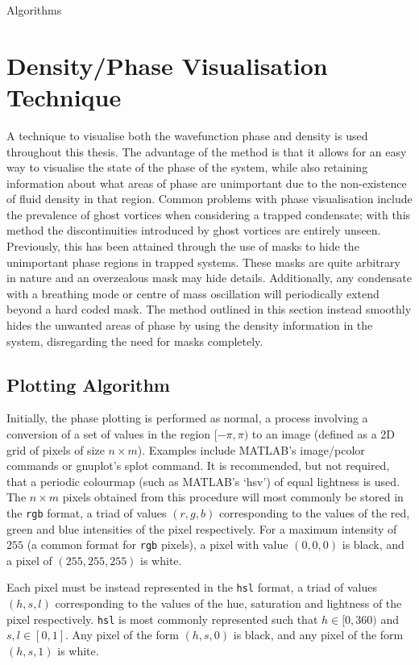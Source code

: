 \begin{chapter}{\label{app:algorithms}Algorithms}
\section{\label{appsection:vizalgos} Density/Phase Visualisation Technique}
A technique to visualise both the wavefunction phase and density is used throughout this thesis. The advantage of the method is that it allows for an easy way to visualise the state of the phase of the system, while also retaining information about what areas of phase are unimportant due to the non-existence of fluid density in that region. Common problems with phase visualisation include the prevalence of ghost vortices\cite{tsubota_kasamatsu_02} when considering a trapped condensate; with this method the discontinuities introduced by ghost vortices are entirely unseen. Previously, this has been attained through the use of masks to hide the unimportant phase regions in trapped systems. These masks are quite arbitrary in nature and an overzealous mask may hide details. Additionally, any condensate with a breathing mode or centre of mass oscillation will periodically extend beyond a hard coded mask. The method outlined in this section instead smoothly hides the unwanted areas of phase by using the density information in the system, disregarding the need for masks completely.
\subsection{Plotting Algorithm}
Initially, the phase plotting is performed as normal, a process involving a conversion of a set of values in the region $[-\pi,\pi)$ to an image (defined as a 2D grid of pixels of size $n\times m$). Examples include MATLAB's image/pcolor commands or gnuplot's splot command. It is recommended, but not required, that a periodic colourmap (such as MATLAB's `hsv') of equal lightness is used. The $n \times m$ pixels obtained from this procedure will most commonly be stored in the {\tt rgb} format, a triad of values $(r,g,b)$ corresponding to the values of the red, green and blue intensities of the pixel respectively. For a maximum intensity of $255$ (a common format for {\tt rgb} pixels), a pixel with value $(0,0,0)$ is black, and a pixel of $(255,255,255)$ is white.

Each pixel must be instead represented in the {\tt hsl} format, a triad of values $(h,s,l)$ corresponding to the values of the hue, saturation and lightness of the pixel respectively. {\tt hsl} is most commonly represented such that $h \in [0,360)$ and $s,l \in [0,1]$. Any pixel of the form $(h,s,0)$ is black, and any pixel of the form $(h,s,1)$ is white.


\end{chapter}
